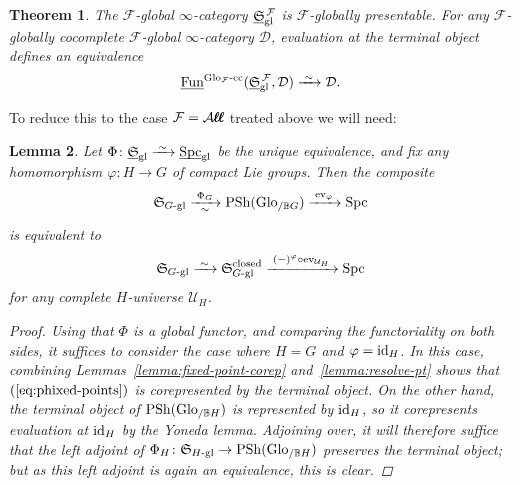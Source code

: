 \documentclass[reqno]{memo-l}
\theoremstyle{mythm}
\newtheorem{thm}{Theorem}[section]
\newtheorem{lemma}[thm]{Lemma}
\theoremstyle{definition}
\numberwithin{equation}{section}
\newcommand{\Aa}{{\mathcal{A}}}
\newcommand{\Dd}{{\mathcal{D}}}
\newcommand{\Ff}{{\mathcal{F}}}
\newcommand{\Uu}{{\mathcal{U}}}
\newcommand{\gl}{\textup{gl}}
\DeclareMathOperator{\ev}{ev}
\renewcommand{\phi}{\varphi}
\DeclareMathOperator{\Spc}{Spc}
\newcommand{\Fun}{{\textup{Fun}}}
\DeclareMathOperator{\PSh}{PSh}
\newcommand{\id}{\textup{id}}
\newcommand{\bigAll}{\hbox{\hfuzz=20pt\hbox{$\mathcal A\kern-.3pt$}\setbox0=\hbox{$\ell\kern-.75pt\ell$}\hbox to 0pt{\hfuzz=8pt\kern-.075pt\unhcopy0}\hbox to 0pt{\hfuzz=8pt\kern.075pt\unhcopy0}\box0\kern.05pt}}
\newcommand{\smallAll}{\Aa\kern-.3pt\ell\kern-.6pt\ell}
\newcommand{\All}{\mathchoice{\bigAll}{\bigAll}{\smallAll}{\smallAll}}
\newcommand{\Glo}{\textup{Glo}}
\newcommand{\BGcat}[1]{\mathbb B{#1}}
\newcommand{\ulhelper}[2]{\underline{\setbox0=\hbox{$#1#2$}\dp0=0.4pt \box0\relax}}
\newcommand{\ul}[1]{{\mathpalette\ulhelper{#1}}\hbox{\rule[-2pt]{0pt}{0pt}}}
\newcommand{\iso}{\xrightarrow{\;\smash{\raisebox{-0.25ex}{\ensuremath{\scriptstyle\sim}}}\;}}
\newcommand{\myS}{{{\mathfrak S\kern-.4pt}}}
\begin{document}
\begin{thm}\label{thm:univ-prop-F-gl-spaces}
    The $\Ff$-global $\infty$-category $\ul\myS_\gl^{\,\Ff}$ is $\Ff$-globally presentable. For any $\Ff$-globally cocomplete $\Ff$-global $\infty$-category $\Dd$, evaluation at the terminal object defines an equivalence
    \[
        \ul\Fun^\textup{$\Glo_\Ff$-cc}(\ul\myS_\gl^{\,\Ff},\Dd)\iso\Dd.
    \]
\end{thm}

To reduce this to the case $\Ff=\All$ treated above we will need:

\begin{lemma}\label{lemma:id-g-fixed-points-vs-ev}
    Let $\Phi\colon\ul\myS_\gl\iso\ul\Spc_\gl$ be the unique equivalence, and fix any homomorphism $\phi\colon H\to G$ of compact Lie groups. Then the composite
    \[
        \myS_\textup{$G$-gl}\xrightarrow[\raise2pt\hbox{$\scriptstyle\smash{\sim}$}]{\;\Phi_G\;} \PSh(\Glo_{/\BGcat{G}})\xrightarrow{\;\ev_\phi\;}\Spc
    \]
    is equivalent to
    \begin{equation}\label{eq:phixed-points}
        \myS_\textup{$G$-gl}\iso\myS_\textup{$G$-gl}^\textup{closed}\xrightarrow{\;(-)^\phi\circ\ev_{\Uu_H}\;}\Spc
    \end{equation}
    for any complete $H$-universe $\Uu_H$.
    \begin{proof}
        Using that $\Phi$ is a global functor, and comparing the functoriality on both sides, it suffices to consider the case where $H=G$ and $\phi=\id_H$. In this case, combining Lemmas~\ref{lemma:fixed-point-corep} and~\ref{lemma:resolve-pt} shows that $(\ref{eq:phixed-points})$ is corepresented by the terminal object. On the other hand, the terminal object of $\PSh(\Glo_{/\BGcat{H}})$ is represented by $\id_H$, so it corepresents evaluation at $\id_H$ by the Yoneda lemma. Adjoining over, it will therefore suffice that the left adjoint of $\Phi_H\colon\myS_\text{$H$-gl}\to\PSh(\Glo_{/\BGcat{H}})$ preserves the terminal object; but as this left adjoint is again an equivalence, this is clear.
    \end{proof}
\end{lemma}
\end{document}
